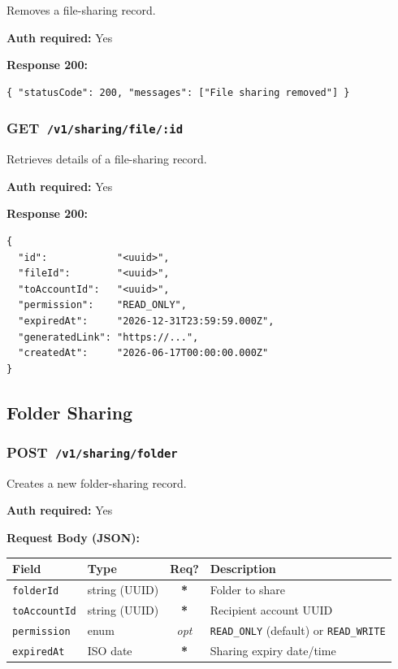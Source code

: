 \documentclass[12pt,a4paper]{article}
\newcommand{\httpget}[1]{%
  \colorbox{getcolor!20}{\textcolor{getcolor}{\textbf{\small GET}}}~\texttt{#1}%
}
\newcommand{\httppost}[1]{%
  \colorbox{postcolor!20}{\textcolor{postcolor}{\textbf{\small POST}}}~\texttt{#1}%
}
\newcommand{\required}{\textcolor{danger}{\textbf{*}}}
\newcommand{\optional}{\textcolor{muted}{\textit{opt}}}
\begin{document}
Removes a file-sharing record.

\textbf{Auth required:} Yes

\textbf{Response 200:}
\begin{lstlisting}
{ "statusCode": 200, "messages": ["File sharing removed"] }
\end{lstlisting}

\vspace{0.5em}
\subsubsection{\httpget{/v1/sharing/file/:id}}

Retrieves details of a file-sharing record.

\textbf{Auth required:} Yes

\textbf{Response 200:}
\begin{lstlisting}
{
  "id":            "<uuid>",
  "fileId":        "<uuid>",
  "toAccountId":   "<uuid>",
  "permission":    "READ_ONLY",
  "expiredAt":     "2026-12-31T23:59:59.000Z",
  "generatedLink": "https://...",
  "createdAt":     "2026-06-17T00:00:00.000Z"
}
\end{lstlisting}

\subsection{Folder Sharing}

\subsubsection{\httppost{/v1/sharing/folder}}

Creates a new folder-sharing record.

\textbf{Auth required:} Yes

\textbf{Request Body (JSON):}

\begin{tabularx}{\linewidth}{llcX}
\toprule
\textbf{Field} & \textbf{Type} & \textbf{Req?} & \textbf{Description} \\
\midrule
\texttt{folderId}    & string (UUID) & \required & Folder to share \\
\texttt{toAccountId} & string (UUID) & \required & Recipient account UUID \\
\texttt{permission}  & enum & \optional & \texttt{READ\_ONLY} (default) or \texttt{READ\_WRITE} \\
\texttt{expiredAt}   & ISO date & \required & Sharing expiry date/time \\
\bottomrule
\end{tabularx}
\end{document}
